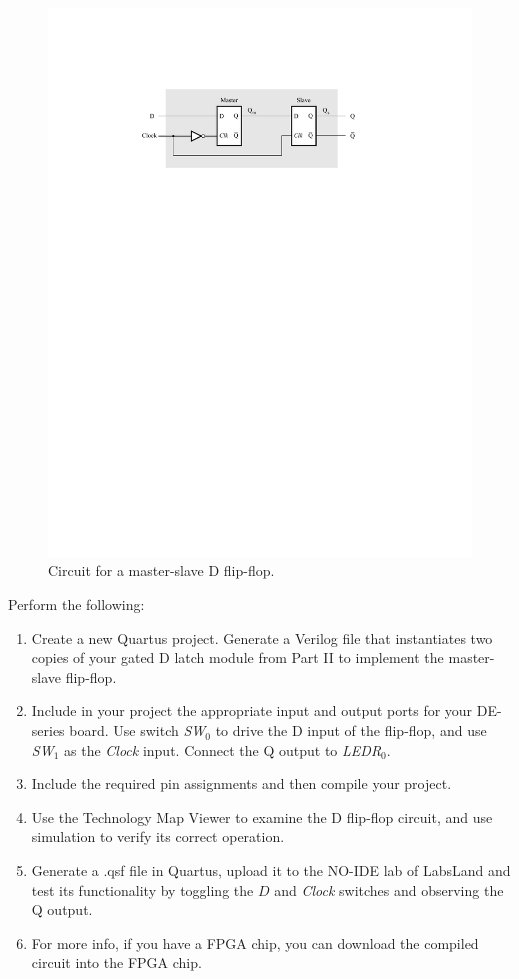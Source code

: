 \documentclass[epsfig,10pt,fullpage]{article}
\begin{document}
\begin{figure}[H]
	\begin{center}
		\includegraphics[]{figures/figure5.pdf}
	\end{center}
	\caption{Circuit for a master-slave D flip-flop.}
\label{fig:MS_FF}
\end{figure}

Perform the following:
\begin{enumerate}
\item Create a new Quartus project. Generate a Verilog file that instantiates two
copies of your gated D latch module from Part II to implement the master-slave flip-flop.
\item Include in your project the appropriate input and output ports for your
DE-series board. Use switch {\it SW}$_0$ to drive the D input of the flip-flop,
and use {\it SW}$_1$ as the {\it Clock} input. Connect the Q output to {\it LEDR}$_{0}$.
\item
Include the required pin assignments and then compile your project.
\item Use the Technology Map Viewer to examine the D flip-flop circuit, and use simulation to
verify its correct operation.
\item
Generate a .qsf file in Quartus, upload it to the NO-IDE lab of LabsLand and test its functionality 
by toggling the $D$ and {\it Clock} switches and observing the Q output.
\item For more info, if you have a FPGA chip, you can download the compiled circuit into the FPGA chip.
\end{enumerate}
\end{document}

